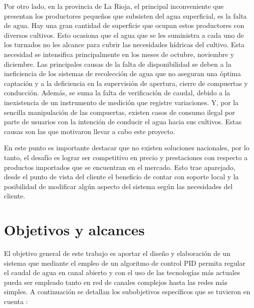 Por otro lado, en la provincia de La Rioja, el principal inconveniente que presentan los productores pequeños que subsisten del agua superficial, es la falta de agua. Hay una gran cantidad de superficie que ocupan estos productores con diversos cultivos. Esto ocasiona que el agua que se les suministra a cada uno de los turnados no les alcance para cubrir las necesidades hídricas del cultivo. Esta necesidad se intensifica principalmente en los meses de octubre, noviembre y diciembre.
Las principales causas de la falta de disponibilidad se deben a la ineficiencia de los sistemas de recolección de agua que no aseguran una óptima captación y a la deficiencia en la supervisión de apertura, cierre de compuertas y conducción. Además, se suma la falta de verificación de caudal, debido a la inexistencia de un instrumento de medición que registre variaciones.
Y, por la sencilla manipulación de las compuertas, existen casos de consumo ilegal por parte de usuarios con la intención de conducir el agua hacia sus cultivos. Estas causas son las que motivaron llevar a cabo este proyecto.

En este punto es importante destacar que no existen soluciones nacionales, por lo tanto,  el desafío es lograr ser competitivo en precio y prestaciones con respecto a productos importados que se encuentran en el mercado. Esto trae aparejado, desde el punto de vista del cliente el beneficio de contar con soporte local y la posibilidad de modificar algún aspecto del sistema según las necesidades del cliente.

\section{Objetivos y alcances}


El objetivo general de este trabajo es aportar el diseño y elaboración de un sistema que mediante el empleo de un algoritmo de control PID permita regular el caudal de agua en canal abierto y con el uso de las tecnologías más actuales pueda ser empleado tanto en red de canales complejos hasta las redes más simples. A continuación se detallan los subobjetivos específicos que se tuvieron en cuenta :  

